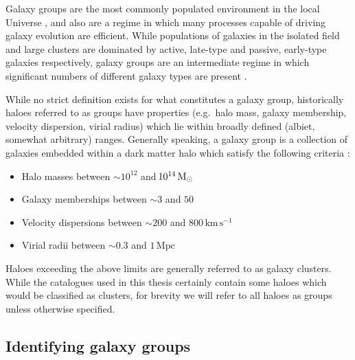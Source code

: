 Galaxy groups are the most commonly populated environment in the local
Universe \citep{geller1983, eke2005}, and also are a regime in which
many processes capable of driving galaxy evolution are efficient.
While populations of galaxies in the isolated field and large clusters are
dominated by active, late-type and passive, early-type galaxies
respectively, galaxy groups are an intermediate regime in which
significant numbers of different galaxy types are present
\citep{wilman2005, mcgee2011}.
\par
While no strict definition exists for what constitutes a galaxy
group, historically haloes referred to as groups have properties
(e.g.\ halo mass, galaxy membership, velocity dispersion, virial
radius) which lie within broadly defined (albiet, somewhat
arbitrary) ranges.  Generally
speaking, a galaxy group is a collection of galaxies embedded within a
dark matter halo which satisfy the following criteria
\citep{mamon2007, connelly2012}:

\begin{itemize}
  \item Halo masses between $\sim\!10^{12}$ and $\!10^{14}\,\mathrm{M_{\odot}}$

  \item Galaxy memberships between $\sim\!3$ and $50$

  \item Velocity dispersions between $\sim\!200$ and
    $800\,\mathrm{km}\,\mathrm{s^{-1}}$
  
  \item Virial radii between $\sim\! 0.3$ and $1\,\mathrm{Mpc}$
\end{itemize}

\noindent
Haloes exceeding the above limits are generally referred to as galaxy
clusters.  While the catalogues used in this thesis certainly
contain some haloes which would be classified as clusters, for brevity
we will refer to all haloes as groups unless otherwise specified.

\subsection{Identifying galaxy groups}
\label{sec:identify_groups}

